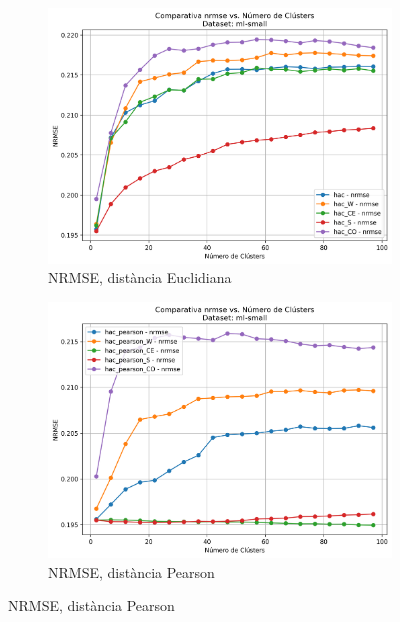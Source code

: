 \documentclass[a4paper,12pt]{report}
\begin{document}
\begin{figure}[H]
    \vspace{1em}

    \begin{subfigure}[b]{0.49\textwidth}
        \includegraphics[width=\textwidth]{Figuras/nrmse-euc-ml-small.png}
        \caption{NRMSE, distància Euclidiana}
        \label{fig:hac-clustering-e-results-c}
    \end{subfigure}
    \hfill
    \begin{subfigure}[b]{0.49\textwidth}
        \includegraphics[width=\textwidth]{Figuras/nrmse-pear-ml-small.png}
        \caption{NRMSE, distància Pearson}
        \label{fig:hac-clustering-e-results-d}
    \end{subfigure}


\end{figure}
\end{document}
